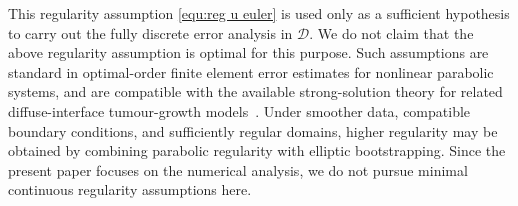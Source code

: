 \documentclass[11pt, reqno]{amsart}
\theoremstyle{definition}
\numberwithin{equation}{section}
\begin{document}
{This regularity assumption \eqref{equ:reg u euler} is used only as a sufficient hypothesis to carry out the fully discrete error analysis in $\mathscr{D}$. We do not claim that the above regularity assumption is optimal for this purpose. Such assumptions are standard in optimal-order finite element error estimates for nonlinear parabolic systems, and are compatible with the available strong-solution theory for related diffuse-interface tumour-growth models~\cite{FriGraRoc15,GarYay20}. Under smoother data, compatible boundary conditions, and sufficiently regular domains, higher regularity may be obtained by combining parabolic regularity with elliptic bootstrapping. Since the present paper focuses on the numerical analysis, we do not pursue minimal continuous regularity assumptions here.}
\end{document}
